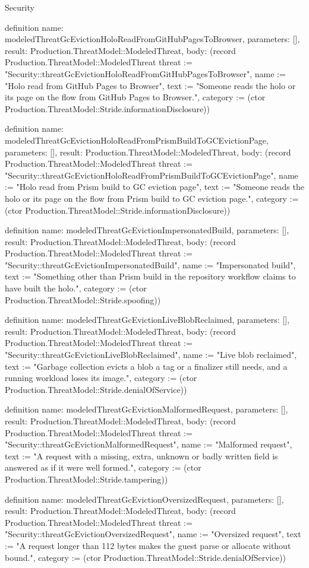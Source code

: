 \begin{lexlean}{Security}
\begin{semanticmodule}
definition{
  name: modeledThreatGcEvictionHoloReadFromGitHubPagesToBrowser,
  parameters: [],
  result: Production.ThreatModel::ModeledThreat,
  body: (record Production.ThreatModel::ModeledThreat {threat := "Security::threatGcEvictionHoloReadFromGitHubPagesToBrowser", name := "Holo read from GitHub Pages to Browser", text := "Someone reads the holo or its page on the flow from GitHub Pages to Browser.", category := (ctor Production.ThreatModel::Stride.informationDisclosure)})
}

definition{
  name: modeledThreatGcEvictionHoloReadFromPrismBuildToGCEvictionPage,
  parameters: [],
  result: Production.ThreatModel::ModeledThreat,
  body: (record Production.ThreatModel::ModeledThreat {threat := "Security::threatGcEvictionHoloReadFromPrismBuildToGCEvictionPage", name := "Holo read from Prism build to GC eviction page", text := "Someone reads the holo or its page on the flow from Prism build to GC eviction page.", category := (ctor Production.ThreatModel::Stride.informationDisclosure)})
}

definition{
  name: modeledThreatGcEvictionImpersonatedBuild,
  parameters: [],
  result: Production.ThreatModel::ModeledThreat,
  body: (record Production.ThreatModel::ModeledThreat {threat := "Security::threatGcEvictionImpersonatedBuild", name := "Impersonated build", text := "Something other than Prism build in the repository workflow claims to have built the holo.", category := (ctor Production.ThreatModel::Stride.spoofing)})
}

definition{
  name: modeledThreatGcEvictionLiveBlobReclaimed,
  parameters: [],
  result: Production.ThreatModel::ModeledThreat,
  body: (record Production.ThreatModel::ModeledThreat {threat := "Security::threatGcEvictionLiveBlobReclaimed", name := "Live blob reclaimed", text := "Garbage collection evicts a blob a tag or a finalizer still needs, and a running workload loses its image.", category := (ctor Production.ThreatModel::Stride.denialOfService)})
}

definition{
  name: modeledThreatGcEvictionMalformedRequest,
  parameters: [],
  result: Production.ThreatModel::ModeledThreat,
  body: (record Production.ThreatModel::ModeledThreat {threat := "Security::threatGcEvictionMalformedRequest", name := "Malformed request", text := "A request with a missing, extra, unknown or badly written field is answered as if it were well formed.", category := (ctor Production.ThreatModel::Stride.tampering)})
}

definition{
  name: modeledThreatGcEvictionOversizedRequest,
  parameters: [],
  result: Production.ThreatModel::ModeledThreat,
  body: (record Production.ThreatModel::ModeledThreat {threat := "Security::threatGcEvictionOversizedRequest", name := "Oversized request", text := "A request longer than 112 bytes makes the guest parse or allocate without bound.", category := (ctor Production.ThreatModel::Stride.denialOfService)})
}


\end{semanticmodule}
\end{lexlean}
